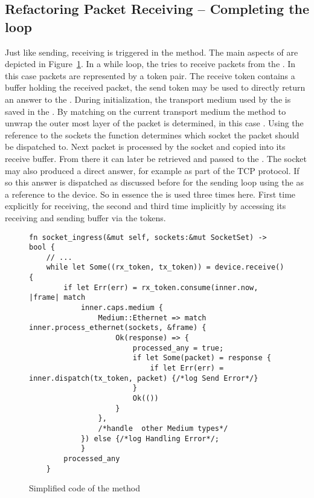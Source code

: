 \subsection{Refactoring Packet Receiving -- Completing the  loop}
Just like sending, receiving is triggered in the  method. The main aspects of  are depicted in Figure~\ref{fig:socketIngressCode}. In a while loop, the \stack{} tries to receive packets from the \dev{}. In this case packets are represented by a token pair. The receive token  contains a buffer holding the received packet, the send token  may be used to directly return an answer to the \dev{}. During initialization, the transport medium used by the \dev{} is saved in the \stack{}. By matching on the current transport medium the method to unwrap the outer most layer of the packet is determined, in this case . Using the reference to the sockets the function determines which socket the packet should be dispatched to. Next packet is processed by the socket and copied into its receive buffer. From there it can later be retrieved and passed to the \store{}. The socket may also produced a direct answer, for example as part of the TCP protocol. If so this answer is dispatched as discussed before for the sending loop using the  as a reference to the device. So in essence the \dev{} is used three times here. First time explicitly for receiving, the second and third time implicitly by accessing its receiving and sending buffer via the tokens.
\begin{figure}[H]
    \centering
\begin{verbatim}
fn socket_ingress(&mut self, sockets:&mut SocketSet) -> bool {
    // ... 
    while let Some((rx_token, tx_token)) = device.receive() {
        if let Err(err) = rx_token.consume(inner.now, |frame| match
            inner.caps.medium {
                Medium::Ethernet => match inner.process_ethernet(sockets, &frame) {
                    Ok(response) => {
                        processed_any = true;
                        if let Some(packet) = response {
                            if let Err(err) = inner.dispatch(tx_token, packet) {/*log Send Error*/}
                        }
                        Ok(())
                    }
                },
                /*handle  other Medium types*/
            }) else {/*log Handling Error*/;
            }
        processed_any
    }
\end{verbatim}
    \caption{Simplified code of the  method}
    \label{fig:socketIngressCode}
\end{figure}

